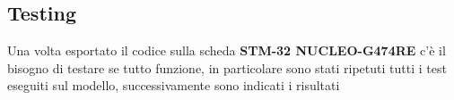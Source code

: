 \documentclass[12pt]{article}
\begin{document}
\subsection{Testing}
Una volta esportato il codice sulla scheda \textbf{STM-32 NUCLEO-G474RE} c'è il bisogno di testare se tutto funzione, in particolare sono stati ripetuti tutti i test eseguiti sul modello, successivamente sono indicati i risultati
\begin{table}[H]
    \centering
    \caption{Variabili utilizzate nel modello Stateflow}
    \label{tab:variables}
\end{table}
\newpage
{}
\listoffigures
\end{document}
